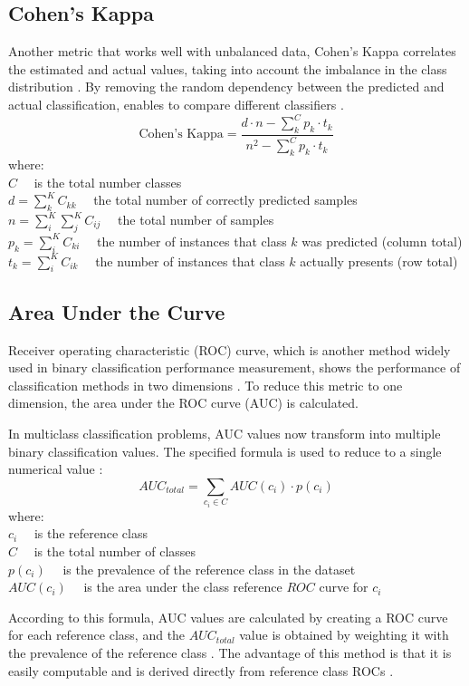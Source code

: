 \subsection{Cohen's Kappa}
Another metric that works well with unbalanced data, Cohen's Kappa correlates the estimated and actual values, taking into account the imbalance in the class distribution \cite{maaritwidmannalfredoroccato2021}. By removing the random dependency between the predicted and actual classification, enables to compare different classifiers \cite{grandini2020metrics}. 
\begin{equation}
\text{Cohen's Kappa} = \displaystyle\frac{d \cdot n-\displaystyle\sum_{k}^{C} p_{k} \cdot t_{k}}{n^{2}-\displaystyle\sum_{k}^{C} p_{k} \cdot t_{k}}
\label{kappa}	
\end{equation}
where:\\
$C\quad$ is the total number classes\\
$d=\displaystyle\sum_{k}^{K} C_{k k} \quad$ the total number of correctly predicted samples\\
$n=\displaystyle\sum_{i}^{K} \displaystyle\sum_{j}^{K} C_{i j}\quad$ the total number of samples\\
$p_{k}=\displaystyle\sum_{i}^{K} C_{k i}\quad$ the number of instances that class $k$ was predicted (column total)\\
$t_{k}=\displaystyle\sum_{i}^{K} C_{i k}\quad$ the number of instances that class $k$ actually presents (row total)

\subsection{Area Under the Curve}
Receiver operating characteristic (ROC) curve, which is another method widely used in binary classification performance measurement, shows the performance of classification methods in two dimensions \cite{fawcett2004roc}. To reduce this metric to one dimension, the area under the ROC curve (AUC) is calculated.

In multiclass classification problems, AUC values now transform into multiple binary classification values. The specified formula is used to reduce to a single numerical value \cite{fawcett2004roc}:
\begin{equation}
AUC_{total} = \displaystyle\sum_{c_{i} \in C} AUC(c_{i}) \cdot p(c_{i})
\label{auc}
\end{equation}
where:\\
$c_{i} \quad$ is the reference class \\
$C \quad$ is the total number of classes\\
$p(c_i) \quad$ is the prevalence of the reference class in the dataset\\
$AUC(c_{i}) \quad$ is the area under the class reference $ROC$ curve for $c_{i}$

According to this formula, AUC values are calculated by creating a ROC curve for each reference class, and the $AUC_{total}$ value is obtained by weighting it with the prevalence of the reference class \cite{fawcett2004roc,he2009learning}. The advantage of this method is that it is easily computable and is derived directly from reference class ROCs \cite{fawcett2004roc}.